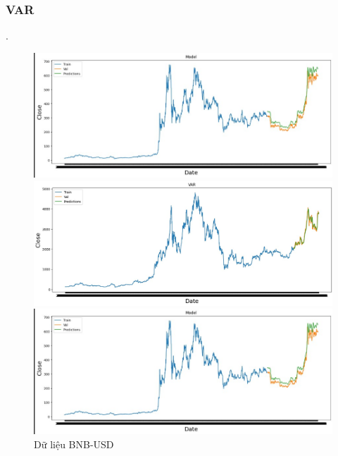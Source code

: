 \documentclass[conference]{IEEEtran}
\begin{document}
	\subsubsection{VAR}.
	\begin{figure}[H]
		\centering
		\begin{minipage}{0.15\textwidth}
			\centering
			\includegraphics[width=1\textwidth]{Figure/VAR_I.jpg}
		\end{minipage}
		\hfill
		\begin{minipage}{0.15\textwidth}
			\centering
			\includegraphics[width=1\textwidth]{Figure/BNB_VAR.jpg}
		\end{minipage}
		\hfill
		\begin{minipage}{0.15\textwidth}
			\centering
			\includegraphics[width=1\textwidth]{Figure/VAR_I.jpg}
		\end{minipage}
		\caption{Dữ liệu BNB-USD}
		\label{fig:1}
	\end{figure}
	
\end{document}
